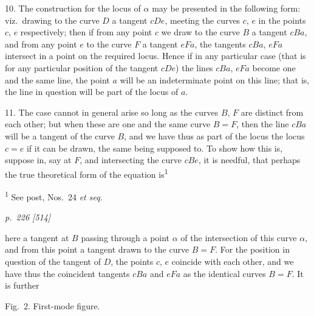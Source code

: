 \documentclass[11pt,a4paper]{article}
\theoremstyle{plain}
\theoremstyle{definition}
\begin{document}
10. The construction for the locus of $\alpha$ may be presented in the following form:
viz.\ drawing to the curve $D$ a tangent $cDe$, meeting the curves $c$, $e$ in the points
$c$, $e$ respectively; then if from any point $c$ we draw to the curve $B$ a tangent $cBa$,
and from any point $e$ to the curve $F$ a tangent $eFa$, the tangents $cBa$, $eFa$ intersect
in a point on the required locus.  Hence if in any particular case (that is for any
particular position of the tangent $cDe$) the lines $cBa$, $eFa$ become one and the same
line, the point $a$ will be an indeterminate point on this line; that is, the line in
question will be part of the locus of $a$.

11. The case cannot in general arise so long as the curves $B$, $F$ are distinct
from each other; but when these are one and the same curve $B=F$, then the line
$cBa$ will be a tangent of the curve $B$, and we have thus as part of the locus the
locus $c=e$ if it can be drawn, the same being supposed to. To show how this is, suppose
in, say at $F$, and intersecting the curve $cBe$, it is needful, that perhaps the true theoretical
form of the equation is\textsuperscript{1}

\vspace{0.5em}
\noindent\textsuperscript{1} See post, Nos.\ 24 \textit{et seq.}

\clearpage

\bigskip
\textit{p.~226 [514]}
\smallskip

here a tangent at $B$ passing through a point $\alpha$ of the intersection of this curve
$\alpha$, and from this point a tangent drawn to the curve $B=F$.  For the position in
question of the tangent of $D$, the points $c$, $e$ coincide with each other, and we have
thus the coincident tangents $cBa$ and $eFa$ as the identical curves $B=F$.  It is further

\begin{center}
Fig.\ 2.  First-mode figure.\\
\end{center}
\end{document}
